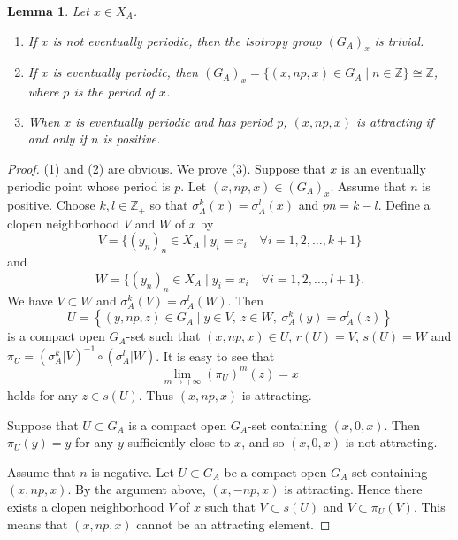 \documentclass[11pt]{article}
\newtheorem{lemma}[theorem]{Lemma}
\theoremstyle{definition}
\numberwithin{equation}{section}
\newcommand{\Z}{\mathbb{Z}}
\begin{document}
\begin{lemma}
Let $x\in X_A$. 
\begin{enumerate}
\item If $x$ is not eventually periodic, then 
the isotropy group $(G_A)_x$ is trivial. 
\item If $x$ is eventually periodic, 
then $(G_A)_x=\{(x,np,x)\in G_A\mid n\in\Z\}\cong\Z$, 
where $p$ is the period of $x$. 
\item When $x$ is eventually periodic and has period $p$, 
$(x,np,x)$ is attracting if and only if $n$ is positive. 
\end{enumerate}
\end{lemma}
\begin{proof}
(1) and (2) are obvious. 
We prove (3). 
Suppose that $x$ is an eventually periodic point whose period is $p$. 
Let $(x,np,x)\in (G_A)_x$. 
Assume that $n$ is positive. 
Choose $k,l\in\Z_+$ so that $\sigma_A^k(x)=\sigma_A^l(x)$ and $pn=k-l$. 
Define a clopen neighborhood $V$ and $W$ of $x$ by 
\[
V=\{(y_n)_n\in X_A\mid y_i=x_i\quad\forall i=1,2,\dots,k{+}1\}
\]
and 
\[
W=\{(y_n)_n\in X_A\mid y_i=x_i\quad\forall i=1,2,\dots,l{+}1\}. 
\]
We have $V\subset W$ and $\sigma_A^k(V)=\sigma_A^l(W)$. 
Then 
\[
U=\left\{(y,np,z)\in G_A
\mid y\in V,\ z\in W,\ \sigma_A^k(y)=\sigma_A^l(z)\right\}
\]
is a compact open $G_A$-set 
such that $(x,np,x)\in U$, $r(U)=V$, $s(U)=W$ and 
$\pi_U=(\sigma_A^k|V)^{-1}\circ(\sigma_A^l|W)$. 
It is easy to see that 
\[
\lim_{m\to+\infty}(\pi_U)^m(z)=x
\]
holds for any $z\in s(U)$. 
Thus $(x,np,x)$ is attracting. 

Suppose that 
$U\subset G_A$ is a compact open $G_A$-set containing $(x,0,x)$. 
Then $\pi_U(y)=y$ for any $y$ sufficiently close to $x$, 
and so $(x,0,x)$ is not attracting. 

Assume that $n$ is negative. 
Let $U\subset G_A$ be a compact open $G_A$-set containing $(x,np,x)$. 
By the argument above, $(x,-np,x)$ is attracting. 
Hence there exists a clopen neighborhood $V$ of $x$ 
such that $V\subset s(U)$ and $V\subset\pi_U(V)$. 
This means that $(x,np,x)$ cannot be an attracting element. 
\end{proof}
\end{document}
